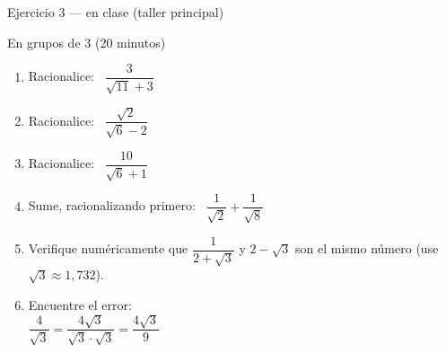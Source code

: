 \documentclass[aspectratio=169,10pt]{beamer}
\begin{document}
\begin{frame}{Ejercicio 3 — en clase (taller principal)}
  \begin{alertblock}{En grupos de 3 (20 minutos)}
    \tiny
    \begin{enumerate}\setlength{\itemsep}{0.05cm}
      \item Racionalice: \ $\dfrac{3}{\sqrt{11}+3}$
      \item Racionalice: \ $\dfrac{\sqrt{2}}{\sqrt{6}-2}$
      \item Racionalice: \ $\dfrac{10}{\sqrt{6}+1}$
      \item Sume, racionalizando primero:
            \ $\dfrac{1}{\sqrt{2}} + \dfrac{1}{\sqrt{8}}$
      \item Verifique numéricamente que $\dfrac{1}{2+\sqrt3}$ y $2-\sqrt3$ son
            el mismo número (use $\sqrt3\approx 1{,}732$).
      \item Encuentre el error: \\
            \hspace*{0.3cm}
            $\dfrac{4}{\sqrt{3}} = \dfrac{4\sqrt3}{\sqrt3\cdot\sqrt3}
            = \dfrac{4\sqrt3}{9}$
    \end{enumerate}
  \end{alertblock}
\end{frame}
\end{document}
